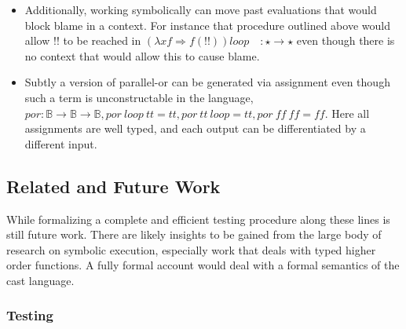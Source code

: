 \begin{itemize}
\item Additionally, working symbolically can move past evaluations that
would block blame in a context. For instance that procedure outlined
above would allow $!!$ to be reached in $\left(\lambda xf\Rightarrow f(!!)\right)loop\quad:\star\rightarrow\star$
even though there is no context that would allow this to cause blame.
\end{itemize}
\begin{itemize}
\item Subtly a version of parallel-or can be generated via assignment even
though such a term is unconstructable in the language, $por:\mathbb{B}\rightarrow\mathbb{B}\rightarrow\mathbb{B},por\ loop\ tt=tt,por\ tt\ loop=tt,por\ ff\ ff=ff$.
Here all assignments are well typed, and each output can be differentiated
by a different input.  
\end{itemize}

\subsection{Related and Future Work}

While formalizing a complete and efficient testing procedure along
these lines is still future work. There are likely insights to be
gained from the large body of research on symbolic execution, especially
work that deals with typed higher order functions. A fully formal
account would deal with a formal semantics of the cast language. 

\subsubsection{Testing}

